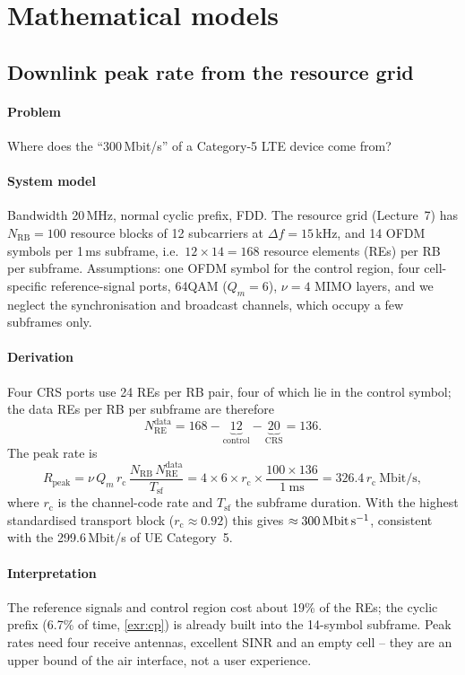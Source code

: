 \documentclass[11pt,a4paper]{article}
\begin{document}
\section{Mathematical models}

\subsection{Downlink peak rate from the resource grid}\label{sec:peak}
\paragraph{Problem} Where does the ``300\,Mbit/s'' of a Category-5 LTE device come from?
\paragraph{System model} Bandwidth 20\,MHz, normal cyclic prefix, FDD. The resource grid
(Lecture~7) has $N_{\mathrm{RB}} = 100$ resource blocks of 12 subcarriers at $\Delta f = 15$\,kHz,
and 14 OFDM symbols per 1\,ms subframe, i.e.\ $12\times14 = 168$ resource elements (REs) per RB
per subframe. Assumptions: one OFDM symbol for the control region, four cell-specific
reference-signal ports, 64QAM ($Q_m = 6$), $\nu = 4$ MIMO layers, and we neglect the
synchronisation and broadcast channels, which occupy a few subframes only.
\paragraph{Derivation} Four CRS ports use 24 REs per RB pair, four of which lie in the control
symbol; the data REs per RB per subframe are therefore
\begin{equation}
  N_{\mathrm{RE}}^{\mathrm{data}} = 168 - \underbrace{12}_{\text{control}} - \underbrace{20}_{\text{CRS}} = 136 .
\end{equation}
The peak rate is
\begin{equation}\label{eq:peak}
  R_{\mathrm{peak}} = \nu\, Q_m\, r_\mathrm{c}\,\frac{N_{\mathrm{RB}}\,N_{\mathrm{RE}}^{\mathrm{data}}}{T_{\mathrm{sf}}}
  = 4\times6\times r_\mathrm{c}\times\frac{100\times136}{\qty{1}{\milli\second}}
  = 326.4\,r_\mathrm{c}\ \mathrm{Mbit/s},
\end{equation}
where $r_\mathrm{c}$ is the channel-code rate and $T_{\mathrm{sf}}$ the subframe duration. With the
highest standardised transport block ($r_\mathrm{c}\approx0.92$) this gives
$\approx\qty{300}{\mega\bit\per\second}$, consistent with the 299.6\,Mbit/s of UE Category~5.
\paragraph{Interpretation} The reference signals and control region cost about 19\% of the REs;
the cyclic prefix (6.7\% of time, \cref{exr:cp}) is already built into the 14-symbol subframe.
Peak rates need four receive antennas, excellent SINR and an empty cell -- they are an upper bound
of the air interface, not a user experience.
\end{document}
